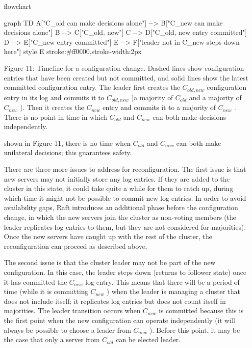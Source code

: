 \documentclass[
]{article}
\newenvironment{Shaded}{}{}
\newcommand{\NormalTok}[1]{#1}
\begin{document}
flowchart

\begin{Shaded}
\begin{Highlighting}[]
\NormalTok{graph TD}
\NormalTok{    A["C\_old can make decisions alone"] {-}{-}\textgreater{} B["C\_new can make decisions alone"]}
\NormalTok{    B {-}{-}\textgreater{} C["C\_old, new"]}
\NormalTok{    C {-}{-}\textgreater{} D["C\_old, new entry committed"]}
\NormalTok{    D {-}{-}\textgreater{} E["C\_new entry committed"]}
\NormalTok{    E {-}{-}\textgreater{} F["leader not in C\_new steps down here"]}
\NormalTok{    style E stroke:\#ff0000,stroke{-}width:2px}
\end{Highlighting}
\end{Shaded}

Figure 11: Timeline for a configuration change. Dashed lines show
configuration entries that have been created but not committed, and
solid lines show the latest committed configuration entry. The leader
first creates the \(C_{old,new}\) configuration entry in its log and
commits it to \(C_{old,new}\) (a majority of \(C_{old}\) and a majority
of \(C_{new}\) ). Then it creates the \(C_{new}\) entry and commits it
to a majority of \(C_{new}\) . There is no point in time in which
\(C_{old}\) and \(C_{new}\) can both make decisions independently.

shown in Figure 11, there is no time when \(C_{old}\) and \(C_{new}\)
can both make unilateral decisions; this guarantees safety.

There are three more issues to address for reconfiguration. The first
issue is that new servers may not initially store any log entries. If
they are added to the cluster in this state, it could take quite a while
for them to catch up, during which time it might not be possible to
commit new log entries. In order to avoid availability gaps, Raft
introduces an additional phase before the configuration change, in which
the new servers join the cluster as non-voting members (the leader
replicates log entries to them, but they are not considered for
majorities). Once the new servers have caught up with the rest of the
cluster, the reconfiguration can proceed as described above.

The second issue is that the cluster leader may not be part of the new
configuration. In this case, the leader steps down (returns to follower
state) once it has committed the \(C_{new}\) log entry. This means that
there will be a period of time (while it is committing \(C_{new}\) )
when the leader is managing a cluster that does not include itself; it
replicates log entries but does not count itself in majorities. The
leader transition occurs when \(C_{new}\) is committed because this is
the first point when the new configuration can operate independently (it
will always be possible to choose a leader from \(C_{new}\) ). Before
this point, it may be the case that only a server from \(C_{old}\) can
be elected leader.
\end{document}

